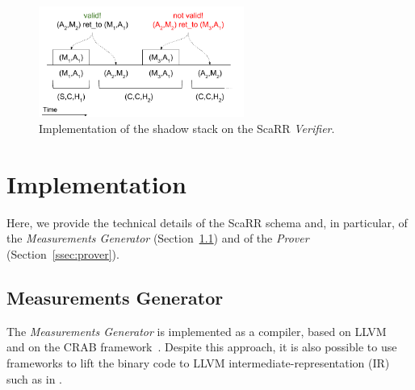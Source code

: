 \begin{figure}[t]
	\centering
	\includegraphics[width=0.6\textwidth]{fig_c4/shadow-stack-no.pdf}
	\caption{Implementation of the shadow stack on the ScaRR \emph{Verifier}.}
	\label{fig:shadow-stack}
\end{figure}

\section{Implementation}
\label{sec:implementation_scarr}

Here, we provide the technical details of the ScaRR schema and, in particular, 
of the \emph{Measurements Generator} 
(Section~\ref{ssec:measurements_generator}) and of the \emph{Prover} 
(Section~\ref{ssec:prover}). 

\subsection{Measurements Generator}
\label{ssec:measurements_generator}
The \emph{Measurements Generator} is implemented as a compiler, based on 
LLVM~\citep{lattner2004llvm} and on the CRAB 
framework~\citep{gange2016abstract}. 
Despite this approach, it is also possible to use frameworks to lift the binary 
code to LLVM intermediate-representation (IR) such as in \citep{mcsema}.

